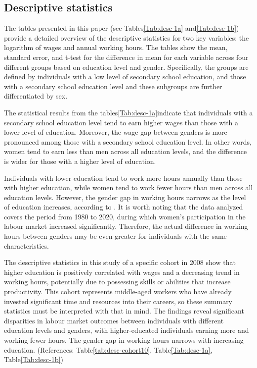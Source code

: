 \documentclass[12pt]{article}
\begin{document}
\subsection{Descriptive statistics}

The tables presented in this paper (see Tables\ref{Tab:desc-1a} and\ref{Tab:desc-1b}) provide a detailed overview of the
descriptive statistics for two key variables: the logarithm of wages and annual working hours. The tables show the mean,
standard error, and t-test for the difference in mean for each variable across four different groups based on education
level and gender. Specifically, the groups are defined by individuals with a low level of secondary school education,
and those with a secondary school education level and these subgroups are further differentiated by sex.
\par
The statistical results from the tables\ref{Tab:desc-1a}indicate that individuals with a secondary school education level tend to earn
higher wages than those with a lower level of education. Moreover, the wage gap between genders is more pronounced among
those with a secondary school education level. In other words, women tend to earn less than men across all education
levels, and the difference is wider for those with a higher level of education.
\par
Individuals with lower education tend to work more hours annually than those with higher education, while women tend to
work fewer hours than men across all education levels. However, the gender gap in working hours narrows as the level of
education increases, according to \citet{goldin}. It is worth noting that the data analyzed covers the period from 1980
to 2020, during which women's participation in the labour market increased significantly. Therefore, the actual
difference in working hours between genders may be even greater for individuals with the same characteristics.
\par
The descriptive statistics in this study of a specific cohort in 2008 show that higher education is positively
correlated with wages and a decreasing trend in working hours, potentially due to possessing skills or abilities that
increase productivity. This cohort represents middle-aged workers who have already invested significant time and
resources into their careers, so these summary statistics must be interpreted with that in mind. The findings reveal
significant disparities in labour market outcomes between individuals with different education levels and genders, with
higher-educated individuals earning more and working fewer hours. The gender gap in working hours narrows with
increasing education. (References: Table\ref{tab:desc-cohort10}, Table\ref{Tab:desc-1a}, Table\ref{Tab:desc-1b})
\end{document}
